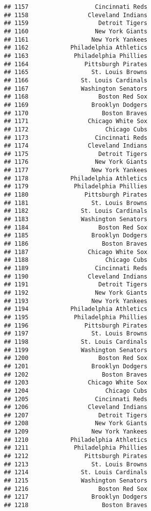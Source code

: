 \documentclass[]{article}
\begin{document}
\begin{verbatim}
## 1157                   Cincinnati Reds
## 1158                 Cleveland Indians
## 1159                    Detroit Tigers
## 1160                   New York Giants
## 1161                  New York Yankees
## 1162            Philadelphia Athletics
## 1163             Philadelphia Phillies
## 1164                Pittsburgh Pirates
## 1165                  St. Louis Browns
## 1166               St. Louis Cardinals
## 1167               Washington Senators
## 1168                    Boston Red Sox
## 1169                  Brooklyn Dodgers
## 1170                     Boston Braves
## 1171                 Chicago White Sox
## 1172                      Chicago Cubs
## 1173                   Cincinnati Reds
## 1174                 Cleveland Indians
## 1175                    Detroit Tigers
## 1176                   New York Giants
## 1177                  New York Yankees
## 1178            Philadelphia Athletics
## 1179             Philadelphia Phillies
## 1180                Pittsburgh Pirates
## 1181                  St. Louis Browns
## 1182               St. Louis Cardinals
## 1183               Washington Senators
## 1184                    Boston Red Sox
## 1185                  Brooklyn Dodgers
## 1186                     Boston Braves
## 1187                 Chicago White Sox
## 1188                      Chicago Cubs
## 1189                   Cincinnati Reds
## 1190                 Cleveland Indians
## 1191                    Detroit Tigers
## 1192                   New York Giants
## 1193                  New York Yankees
## 1194            Philadelphia Athletics
## 1195             Philadelphia Phillies
## 1196                Pittsburgh Pirates
## 1197                  St. Louis Browns
## 1198               St. Louis Cardinals
## 1199               Washington Senators
## 1200                    Boston Red Sox
## 1201                  Brooklyn Dodgers
## 1202                     Boston Braves
## 1203                 Chicago White Sox
## 1204                      Chicago Cubs
## 1205                   Cincinnati Reds
## 1206                 Cleveland Indians
## 1207                    Detroit Tigers
## 1208                   New York Giants
## 1209                  New York Yankees
## 1210            Philadelphia Athletics
## 1211             Philadelphia Phillies
## 1212                Pittsburgh Pirates
## 1213                  St. Louis Browns
## 1214               St. Louis Cardinals
## 1215               Washington Senators
## 1216                    Boston Red Sox
## 1217                  Brooklyn Dodgers
## 1218                     Boston Braves

\end{verbatim}
\end{document}
